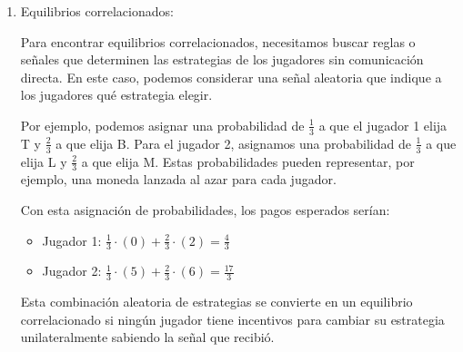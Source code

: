 \documentclass[11pt]{article}
\begin{document}
\begin{enumerate}
    \item Equilibrios correlacionados:
    
    Para encontrar equilibrios correlacionados, necesitamos buscar reglas o señales que determinen las estrategias de los jugadores sin comunicación directa. En este caso, podemos considerar una señal aleatoria que indique a los jugadores qué estrategia elegir.
    
    Por ejemplo, podemos asignar una probabilidad de $\frac{1}{3}$ a que el jugador 1 elija T y $\frac{2}{3}$ a que elija B. Para el jugador 2, asignamos una probabilidad de $\frac{1}{3}$ a que elija L y $\frac{2}{3}$ a que elija M. Estas probabilidades pueden representar, por ejemplo, una moneda lanzada al azar para cada jugador.
    
    Con esta asignación de probabilidades, los pagos esperados serían:
    \begin{itemize}
    \item Jugador 1: $\frac{1}{3} \cdot (0) + \frac{2}{3} \cdot (2) = \frac{4}{3}$
    \item Jugador 2: $\frac{1}{3} \cdot (5) + \frac{2}{3} \cdot (6) = \frac{17}{3}$
    \end{itemize}
    
    Esta combinación aleatoria de estrategias se convierte en un equilibrio correlacionado si ningún jugador tiene incentivos para cambiar su estrategia unilateralmente sabiendo la señal que recibió.
    
\end{enumerate}
\end{document}
